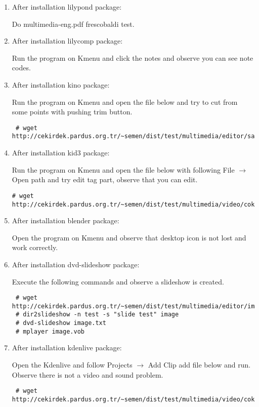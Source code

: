 \documentclass[a4paper,10pt]{article}
\begin{document}
\begin{enumerate}

\item After installation lilypond package:

  Do multimedia-eng.pdf frescobaldi test.

\item After installation lilycomp package:
   
 Run the program on Kmenu and click the notes and observe you can see note codes.

\item After installation kino package:

  Run the program on Kmenu and open the file below and try to cut from some points with pushing trim button.
\begin{verbatim}
 # wget http://cekirdek.pardus.org.tr/~semen/dist/test/multimedia/editor/sample.dv
\end{verbatim}


\item After installation kid3 package:

Run the program on Kmenu and open the file below with following File $\rightarrow$ Open path and try edit tag part, observe that you can edit.

\begin{verbatim}
# wget http://cekirdek.pardus.org.tr/~semen/dist/test/multimedia/video/cokluortam/linux.mp3 
\end{verbatim}



 
 \item After installation blender package:

  Open the program on Kmenu and observe that desktop icon is not lost and work correctly. 

 \item After installation dvd-slideshow package:

Execute the following commands and observe a slideshow is created.
\begin{verbatim}
 # wget http://cekirdek.pardus.org.tr/~semen/dist/test/multimedia/editor/image.tar.gz
 # dir2slideshow -n test -s "slide test" image
 # dvd-slideshow image.txt
 # mplayer image.vob 
\end{verbatim}
\item After installation kdenlive package:

Open the Kdenlive and follow Projects $\rightarrow$ Add Clip add file below and run. Observe there is not a video and sound problem.
\begin{verbatim}
 # wget http://cekirdek.pardus.org.tr/~semen/dist/test/multimedia/video/cokluortam/DVD.mpg
\end{verbatim}


\end{enumerate}
\end{document}
